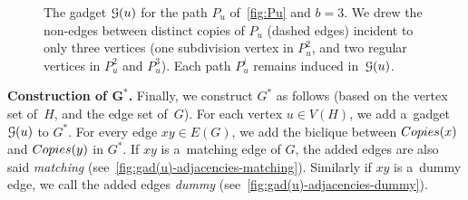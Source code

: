 \documentclass[a4paper,UKenglish,cleveref,hyperref,autoref]{lipics-v2021}
\begin{document}
\begin{figure}[h!]
  \caption{The gadget $\mathcal G(u)$ for the path $P_u$ of~\cref{fig:Pu} and $b = 3$.
    We drew the non-edges between distinct copies of $P_u$ (dashed edges) incident to only three vertices (one subdivision vertex in $P_u^2$, and two regular vertices in $P_u^2$ and $P_u^3$).
  Each path $P_u^i$ remains induced in~$\mathcal G(u)$.}
  \label{fig:Qu}
\end{figure}


\medskip

\textbf{Construction of $\bm{G^*}$.}
Finally, we construct $G^*$ as follows (based on the vertex set of~$H$, and the edge set of~$G$).
For each vertex $u \in V(H)$, we add a~gadget $\mathcal G(u)$ to $G^*$.  
For every edge $xy \in E(G)$, we add the biclique between $\copies(x)$ and $\copies(y)$ in $G^*$.
If $xy$ is a~matching edge of $G$, the added edges are also said \emph{matching} (see~\cref{fig:gad(u)-adjacencies-matching}).
Similarly if $xy$ is a~dummy edge, we call the added edges \emph{dummy} (see~\cref{fig:gad(u)-adjacencies-dummy}).
\end{document}
